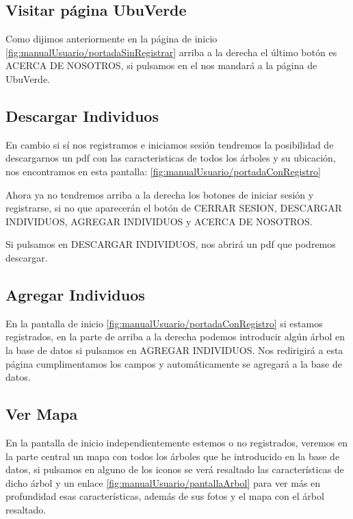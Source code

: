 \subsection{Visitar página UbuVerde}

Como dijimos anteriormente en la página de inicio \ref{fig:manualUsuario/portadaSinRegistrar} arriba a la derecha el último botón es ACERCA DE NOSOTROS, si pulsamos en el nos mandará a la página de UbuVerde.

\subsection{Descargar Individuos}

En cambio si sí nos registramos e iniciamos sesión tendremos la posibilidad de descargarnos un pdf con las caracteristicas de todos los árboles y su ubicación, nos encontramos en esta pantalla: \ref{fig:manualUsuario/portadaConRegistro}

 
Ahora ya no tendremos arriba a la derecha los botones de iniciar sesión y registrarse, si no que aparecerán el botón de CERRAR SESION, DESCARGAR INDIVIDUOS, AGREGAR INDIVIDUOS y ACERCA DE NOSOTROS.


Si pulsamos en DESCARGAR INDIVIDUOS, nos abrirá un pdf que podremos descargar. 

\subsection{Agregar Individuos}

En la pantalla de inicio \ref{fig:manualUsuario/portadaConRegistro} si estamos registrados, en la parte de arriba a la derecha podemos introducir algún árbol en la base de datos si pulsamos en AGREGAR INDIVIDUOS. Nos redirigirá a esta página  cumplimentamos los campos y automáticamente se agregará a la base de datos.

\subsection{Ver Mapa}

En la pantalla de inicio independientemente estemos o no registrados, veremos en la parte central un mapa con todos los árboles que he introducido en la base de datos, si pulsamos en alguno de los iconos se verá resaltado las características de dicho árbol y un enlace \ref{fig:manualUsuario/pantallaArbol} para ver más en profundidad esas características, además de sus fotos y el mapa con el árbol resaltado.

